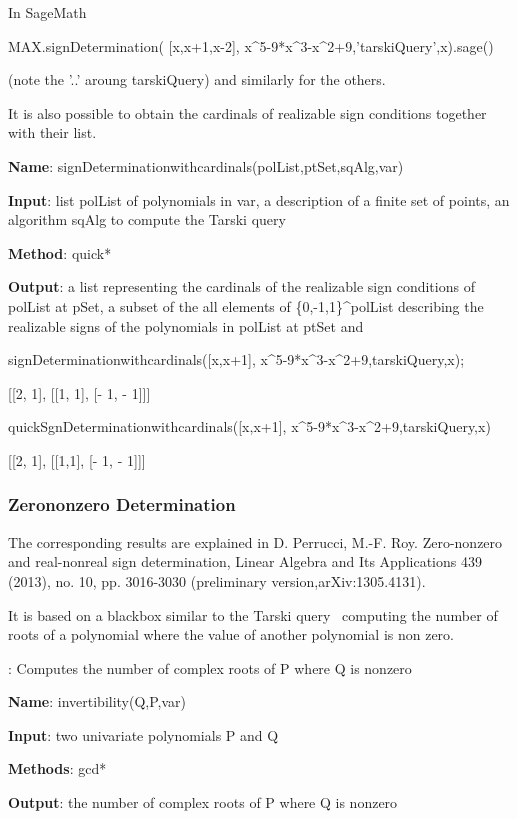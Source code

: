 \documentclass{article}
\begin{document}
 \noindent In SageMath 
 
 MAX.signDetermination( [x,x+1,x-2], x\^{}5-9*x\^{}3-x\^{}2+9,'tarskiQuery',x).sage()
  
  \noindent (note the '..' aroung tarskiQuery) and similarly for the others.
  
  It is also possible to obtain the cardinals of realizable sign conditions
  together with their list.
  
 {\bf Name}: signDeterminationwithcardinals(polList,ptSet,sqAlg,var)
  
  {\bf Input}: list polList of polynomials in var, a description of a finite set of
  points, an algorithm sqAlg to compute the Tarski query
  
  {\bf  Method}:  quick*

   {\bf Output}: a list representing the cardinals of the realizable sign
  conditions of polList at pSet, a subset of the all elements of
  \{0,-1,1\}\^{}polList describing the realizable signs of the polynomials in
  polList at ptSet and
  
  
signDeterminationwithcardinals([x,x+1], x\^{}5-9*x\^{}3-x\^{}2+9,tarskiQuery,x);

 [[2, 1], [[1, 1], [- 1, - 1]]]
 
 quickSgnDeterminationwithcardinals([x,x+1], x\^{}5-9*x\^{}3-x\^{}2+9,tarskiQuery,x)
 
  [[2, 1], [[1,1], [- 1, - 1]]]


\subsubsection{Zerononzero Determination}

The corresponding results are explained in D. Perrucci, M.-F. Roy.
Zero-nonzero and real-nonreal sign determination, Linear Algebra and Its
Applications 439 (2013), no. 10, pp. 3016-3030 (preliminary
version,arXiv:1305.4131).

It is based on a blackbox similar to the Tarski query \ computing the number
of roots of a polynomial where the value of another polynomial is non zero.

: Computes the number of complex roots of P where Q is nonzero

{\bf Name}: invertibility(Q,P,var)

{\bf Input}: two univariate polynomials P and Q

{\bf Methods}: gcd*
 
{\bf Output}: the number of complex roots of P where Q is nonzero
\end{document}
